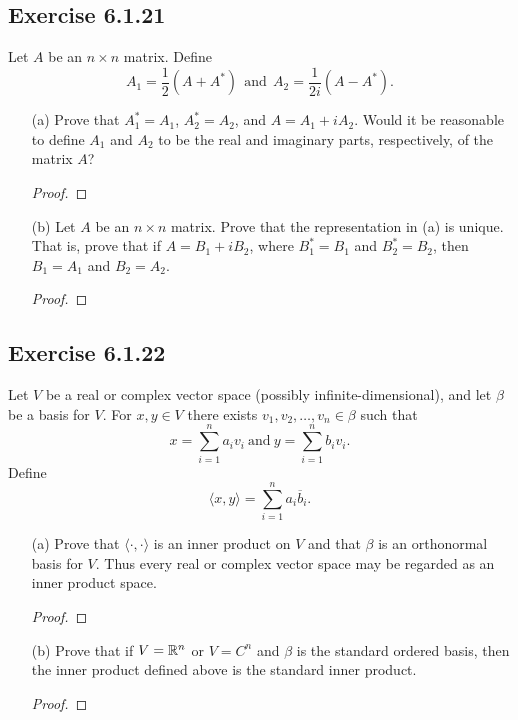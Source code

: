 \subsection*{Exercise 6.1.21} Let \( A  \) be an \( n \times n  \) matrix. Define
\[  {A}_{1} = \frac{ 1 }{ 2 }  (A + A^{*}) \ \ \text{and} \ \ {A}_{2} = \frac{ 1 }{ 2i }  (A - A^{*}). \]
\begin{enumerate}
    \item[(a)] Prove that \( {A}_{1}^{*} = {A}_{1} \), \( {A}_{2}^{*} = {A}_{2} \), and \( A = {A}_{1} + i {A}_{2} \). Would it be reasonable to define \( {A}_{1}  \) and \( {A}_{2}  \) to be the real and imaginary parts, respectively, of the matrix \( A  \)?
        \begin{proof}
        
        \end{proof}
    \item[(b)] Let \( A  \) be an \( n \times n  \) matrix. Prove that the representation in (a) is unique. That is, prove that if \( A = {B}_{1} + i {B}_{2} \), where \( {B}_{1}^{*} = {B}_{1} \) and \( {B}_{2}^{*} = {B}_{2} \), then \( {B}_{1} = {A}_{1} \) and \( {B}_{2} = {A}_{2} \).
        \begin{proof}
        
        \end{proof}
\end{enumerate}



\subsection*{Exercise 6.1.22} Let \( V  \) be a real or complex vector space (possibly infinite-dimensional), and let \( \beta \) be a basis for \( V  \). For \( x,y \in V  \) there exists \( {v}_{1}, {v}_{2}, \dots, {v}_{n} \in \beta  \) such that
\[  x = \sum_{ i=1  }^{ n  } {a}_{i} {v}_{i} \ \text{and} \ y = \sum_{ i=1  }^{ n } {b}_{i} {v}_{i}. \]
Define 
\[  \langle x , y \rangle = \sum_{ i=1  }^{ n } {a}_{i}\overline{b}_{i}. \]
\begin{enumerate}
    \item[(a)] Prove that \( \langle \cdot  ,  \cdot  \rangle \) is an inner product on \( V  \) and that \( \beta  \) is an orthonormal basis for \( V  \). Thus every real or complex vector space may be regarded as an inner product space.
        \begin{proof}
        
        \end{proof}
    \item[(b)] Prove that if \( V = \mathbb{R}^{n}  \) or \( V = C^{n} \) and \( \beta  \) is the standard ordered basis, then the inner product defined above is the standard inner product.
        \begin{proof}
        
        \end{proof}
\end{enumerate}

